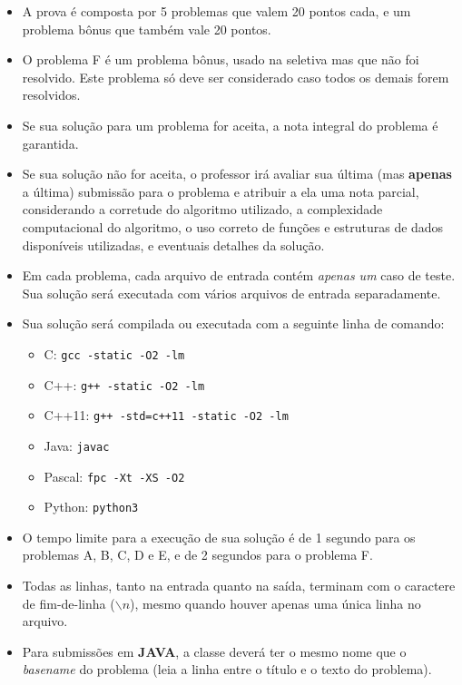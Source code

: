 \documentclass[12pt,oneside]{article} %
\begin{document}
\begin{itemize}

    \item A prova é composta por 5 problemas que valem 20 pontos cada, e um
    problema bônus que também vale 20 pontos.

    \item O problema F é um problema bônus, usado na seletiva mas que não foi resolvido.
    Este problema só deve ser considerado caso todos os demais forem resolvidos.

    \item Se sua solução para um problema for aceita, a nota integral
    do problema é garantida.

    \item Se sua solução não for aceita, o professor irá avaliar sua última (mas
            \textbf{apenas} a última) submissão para o problema e atribuir a ela uma
    nota parcial, considerando a corretude do algoritmo utilizado, a
    complexidade computacional do algoritmo, o uso correto de funções e estruturas de dados
    disponíveis utilizadas, e eventuais detalhes da solução.

    \item Em cada problema, cada arquivo de entrada contém \textit{apenas um} caso de
    teste. Sua solução será executada com vários arquivos de entrada
    separadamente.

    \item Sua solução será compilada ou executada com a seguinte linha de comando:
    \begin{itemize}
        \item C: \verb|gcc -static -O2 -lm|
        \item C++: \verb|g++ -static -O2 -lm|
        \item C++11: \verb|g++ -std=c++11 -static -O2 -lm|
        \item Java: \verb|javac|
        \item Pascal: \verb|fpc -Xt -XS -O2|
        \item Python: \verb|python3|
    \end{itemize}

    \item O tempo limite para a execução de sua solução é de 1 segundo para os
    problemas A, B, C, D e E, e de 2 segundos para o problema F.

    \item Todas as linhas, tanto na entrada quanto na saída, terminam com o
    caractere de fim-de-linha ($\backslash n$), mesmo quando houver apenas uma única
    linha no arquivo.

    \item Para submissões em \textbf{JAVA}, a classe deverá ter o mesmo nome que
    o \textit{basename} do problema (leia a linha entre o título e o texto do
    problema).

\end{itemize}
\end{document}
